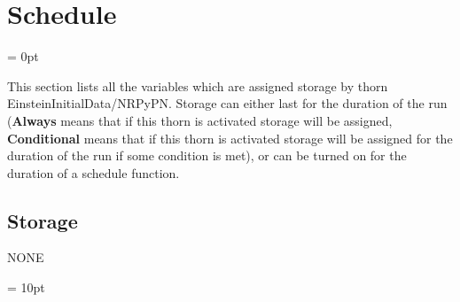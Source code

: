 
\section{Schedule} 


\parskip = 0pt


\noindent This section lists all the variables which are assigned storage by thorn EinsteinInitialData/NRPyPN.  Storage can either last for the duration of the run ({\bf Always} means that if this thorn is activated storage will be assigned, {\bf Conditional} means that if this thorn is activated storage will be assigned for the duration of the run if some condition is met), or can be turned on for the duration of a schedule function.


\subsection*{Storage}NONE

\vspace{5mm}\parskip = 10pt 
